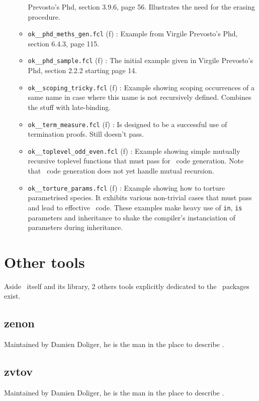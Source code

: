 \begin{itemize}
\begin{itemize}
      Prevosto's Phd, section 3.9.6, page 56. Illustrates the need for
      the erasing procedure.
    \item {\tt ok\_\_phd\_meths\_gen.fcl} (f) : Example from Virgile
      Prevosto's Phd, section 6.4.3, page 115.
    \item {\tt ok\_\_phd\_sample.fcl} (f) : The initial example given
      in Virgile Prevosto's Phd, section 2.2.2 starting page 14.
    \item {\tt ok\_\_scoping\_tricky.fcl} (f) : Example showing
      scoping occurrences of a same name in case where this name is not
      recursively defined. Combines the stuff with late-binding.
    \item {\tt ok\_\_term\_measure.fcl} (f) : Is designed to be a
      successful use of termination proofs. Still doesn't pass.
    \item {\tt ok\_\_toplevel\_odd\_even.fcl} (f) : Example showing
      simple  mutually recursive toplevel functions that must pass for
      \ocaml\ code generation. Note that \coq\ code generation does
      not yet handle mutual recursion.
    \item {\tt ok\_\_torture\_params.fcl} (f) : Example showing how to
      torture parametrised species. It exhibits various non-trivial
      cases that must pass and lead to effective \ocaml\/\coq\
      code. These examples make heavy use of {\tt in}, {\tt is}
      parameters and inheritance to shake the compiler's instanciation
      of parameters during inheritance.
  \end{itemize}
\end{itemize}

\section{Other tools}
Aside \focalizec\ itself and its library, 2 others tools explicitly
dedicated to the \focalize\ packages exist.

\subsection{zenon}
Maintained by Damien Doliger, he is the man in the place to describe
\smiley.

\subsection{zvtov}
Maintained by Damien Doliger, he is the man in the place to describe
\smiley.


